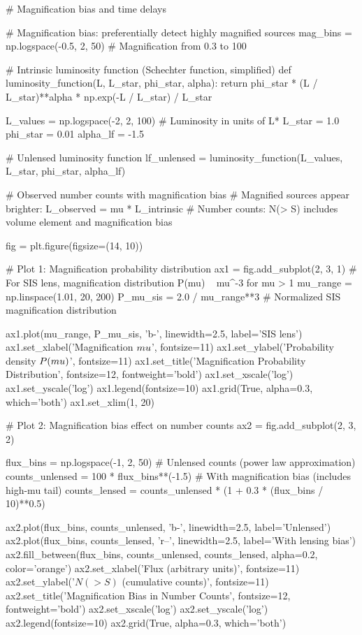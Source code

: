 \documentclass[11pt,a4paper]{article}
\begin{document}
\begin{pycode}
# Magnification bias and time delays

# Magnification bias: preferentially detect highly magnified sources
mag_bins = np.logspace(-0.5, 2, 50)  # Magnification from 0.3 to 100

# Intrinsic luminosity function (Schechter function, simplified)
def luminosity_function(L, L_star, phi_star, alpha):
    return phi_star * (L / L_star)**alpha * np.exp(-L / L_star) / L_star

L_values = np.logspace(-2, 2, 100)  # Luminosity in units of L*
L_star = 1.0
phi_star = 0.01
alpha_lf = -1.5

# Unlensed luminosity function
lf_unlensed = luminosity_function(L_values, L_star, phi_star, alpha_lf)

# Observed number counts with magnification bias
# Magnified sources appear brighter: L_observed = mu * L_intrinsic
# Number counts: N(> S) includes volume element and magnification bias

fig = plt.figure(figsize=(14, 10))

# Plot 1: Magnification probability distribution
ax1 = fig.add_subplot(2, 3, 1)
# For SIS lens, magnification distribution P(mu) ~ mu^-3 for mu > 1
mu_range = np.linspace(1.01, 20, 200)
P_mu_sis = 2.0 / mu_range**3  # Normalized SIS magnification distribution

ax1.plot(mu_range, P_mu_sis, 'b-', linewidth=2.5, label='SIS lens')
ax1.set_xlabel('Magnification $\\mu$', fontsize=11)
ax1.set_ylabel('Probability density $P(\\mu)$', fontsize=11)
ax1.set_title('Magnification Probability Distribution', fontsize=12, fontweight='bold')
ax1.set_xscale('log')
ax1.set_yscale('log')
ax1.legend(fontsize=10)
ax1.grid(True, alpha=0.3, which='both')
ax1.set_xlim(1, 20)

# Plot 2: Magnification bias effect on number counts
ax2 = fig.add_subplot(2, 3, 2)

flux_bins = np.logspace(-1, 2, 50)
# Unlensed counts (power law approximation)
counts_unlensed = 100 * flux_bins**(-1.5)
# With magnification bias (includes high-mu tail)
counts_lensed = counts_unlensed * (1 + 0.3 * (flux_bins / 10)**0.5)

ax2.plot(flux_bins, counts_unlensed, 'b-', linewidth=2.5, label='Unlensed')
ax2.plot(flux_bins, counts_lensed, 'r--', linewidth=2.5, label='With lensing bias')
ax2.fill_between(flux_bins, counts_unlensed, counts_lensed, alpha=0.2, color='orange')
ax2.set_xlabel('Flux (arbitrary units)', fontsize=11)
ax2.set_ylabel('$N(> S)$ (cumulative counts)', fontsize=11)
ax2.set_title('Magnification Bias in Number Counts', fontsize=12, fontweight='bold')
ax2.set_xscale('log')
ax2.set_yscale('log')
ax2.legend(fontsize=10)
ax2.grid(True, alpha=0.3, which='both')


\end{pycode}
\end{document}
